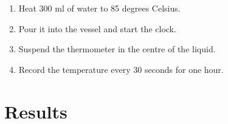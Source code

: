 \documentclass[a4paper,11pt]{article}
\begin{document}
\begin{enumerate}
    \item Heat 300 ml of water to 85 degrees Celsius.
    \item Pour it into the vessel and start the clock.
    \item Suspend the thermometer in the centre of the liquid.
    \item Record the temperature every 30 seconds for one hour.
\end{enumerate}

%
%

%
%

\section{Results}\label{sec:results}

%
\end{document}

